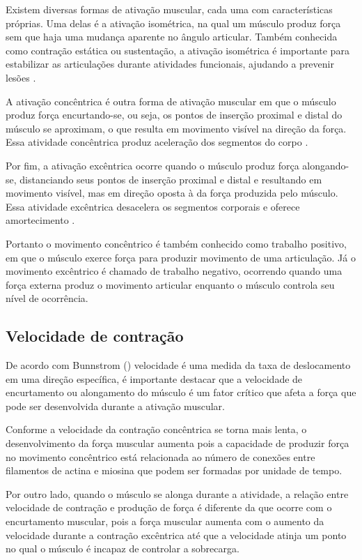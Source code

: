 Existem diversas formas de ativação muscular, cada uma com características próprias. Uma delas é a ativação isométrica, na qual um músculo produz força sem que haja uma mudança aparente no ângulo articular. Também conhecida como contração estática ou sustentação, a ativação isométrica é importante para estabilizar as articulações durante atividades funcionais, ajudando a prevenir lesões \cite{cinesiologia}.

A ativação concêntrica é outra forma de ativação muscular em que o músculo produz força encurtando-se, ou seja, os pontos de inserção proximal e distal do músculo se aproximam, o que resulta em movimento visível na direção da força. Essa atividade concêntrica produz aceleração dos segmentos do corpo \cite{cinesiologia}.

Por fim, a ativação excêntrica ocorre quando o músculo produz força alongando-se, distanciando seus pontos de inserção proximal e distal e resultando em movimento visível, mas em direção oposta à da força produzida pelo músculo. Essa atividade excêntrica desacelera os segmentos corporais e oferece amortecimento \cite{cinesiologia}.

Portanto o movimento concêntrico é também conhecido como trabalho positivo, em que o músculo exerce força para produzir movimento de uma articulação. Já o movimento excêntrico é chamado de trabalho negativo, ocorrendo quando uma força externa produz o movimento articular enquanto o músculo controla seu nível de ocorrência.



\subsection[Velocidade de Contração]{Velocidade de contração}
De acordo com Bunnstrom (\citeyear{cinesiologia}) velocidade é uma medida da taxa de deslocamento em uma direção específica, é importante destacar que a velocidade de encurtamento ou alongamento do músculo é um fator crítico que afeta a força que pode ser desenvolvida durante a ativação muscular.

Conforme a velocidade da contração concêntrica se torna mais lenta, o desenvolvimento da força muscular aumenta pois a capacidade de produzir força no movimento concêntrico está relacionada ao número de conexões entre filamentos de actina e miosina que podem ser formadas por unidade de tempo.

Por outro lado, quando o músculo se alonga durante a atividade, a relação entre velocidade de contração e produção de força é diferente da que ocorre com o encurtamento muscular, pois a força muscular aumenta com o aumento da velocidade durante a contração excêntrica até que a velocidade atinja um ponto no qual o músculo é incapaz de controlar a sobrecarga.




